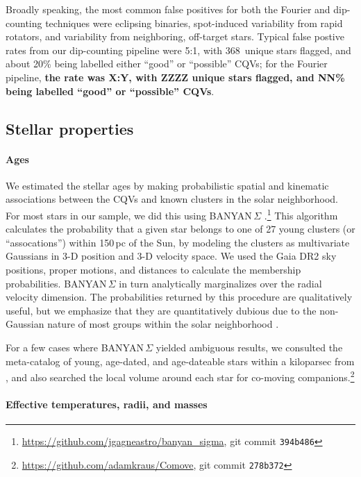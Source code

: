 \documentclass[11pt,twocolumn,tighten]{aastex63}
\newcommand{\nuniqdipflagged}{{368}} %
\begin{document}
Broadly speaking, the most common false positives for both the Fourier
and dip-counting techniques were eclipsing binaries, spot-induced
variability from rapid rotators, and variability from neighboring,
off-target stars.  Typical false postive rates from our dip-counting
pipeline were 5:1, with \nuniqdipflagged\ unique stars flagged, and
about 20\% being labelled either ``good'' or ``possible'' CQVs; for
the Fourier pipeline, {\bf the rate was X:Y, with ZZZZ unique stars
flagged, and NN\% being labelled ``good'' or ``possible'' CQVs}.


\subsection{Stellar properties}
\label{subsec:starprops}

\paragraph{Ages}
We estimated the stellar ages by making probabilistic spatial and
kinematic associations between the CQVs and known clusters in the
solar neighborhood.  For most stars in our sample, we did this using
BANYAN\,$\Sigma$
\citep{2018ApJ...856...23G}.\footnote{\url{https://github.com/jgagneastro/banyan_sigma},
git commit \texttt{394b486}} This algorithm calculates the probability
that a given star belongs to one of 27 young clusters (or
``assocations'') within 150\,pc of the Sun, by modeling the clusters
as multivariate Gaussians in 3-D position and 3-D velocity space.  We
used the Gaia DR2 sky positions, proper motions, and distances to
calculate the membership probabilities.  BANYAN\,$\Sigma$ in turn
analytically marginalizes over the radial velocity dimension.  The
probabilities returned by this procedure are qualitatively useful, but
we emphasize that they are quantitatively dubious due to the
non-Gaussian nature of most groups within the solar neighborhood
\citep[see e.g.][Figure~10]{2021ApJ...917...23K}.

For a few cases where BANYAN\,$\Sigma$ yielded ambiguous results, we
consulted the meta-catalog of young, age-dated, and age-dateable stars
within a kiloparsec from \citet{2022AJ....163..121B}, and also
searched the local volume around each star for co-moving
companions.\footnote{\url{https://github.com/adamkraus/Comove}, git
commit \texttt{278b372}}


\paragraph{Effective temperatures, radii, and masses}
\end{document}
